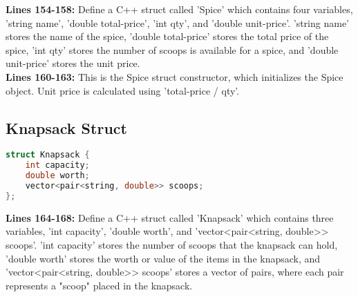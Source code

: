 \documentclass[letterpaper, 10pt,DIV=13]{scrartcl}
\numberwithin{equation}{section} %
\numberwithin{figure}{section} %
\numberwithin{table}{section} %
\begin{document}
\textbf{Lines 154-158:} Define a C++ struct called 'Spice' which contains four variables, 'string name', 'double total-price', 'int qty', and 'double unit-price'.  'string name' stores the name of the spice, 'double total-price' stores the total price of the spice, 'int qty' stores the number of scoops is available for a spice, and 'double unit-price' stores the unit price.\\
\textbf{Lines 160-163:} This is the Spice struct constructor, which initializes the Spice object. Unit price is calculated using 'total-price / qty'.

\subsection{Knapsack Struct}
\begin{linenumbers}
\begin{lstlisting}[language=C++, caption={Knapsack Struct}, label={code:example}]
struct Knapsack {
    int capacity;
    double worth;
    vector<pair<string, double>> scoops;
};
\end{lstlisting}
\end{linenumbers}
\nolinenumbers

\textbf{Lines 164-168:} Define a C++ struct called 'Knapsack' which contains three variables, 'int capacity', 'double worth', and 'vector<pair<string, double>> scoops'. 'int capacity' stores the number of scoops that the knapsack can hold, 'double worth' stores the worth or value of the items in the knapsack, and 'vector<pair<string, double>> scoops' stores a vector of pairs, where each pair represents a "scoop" placed in the knapsack. \\
\end{document}
